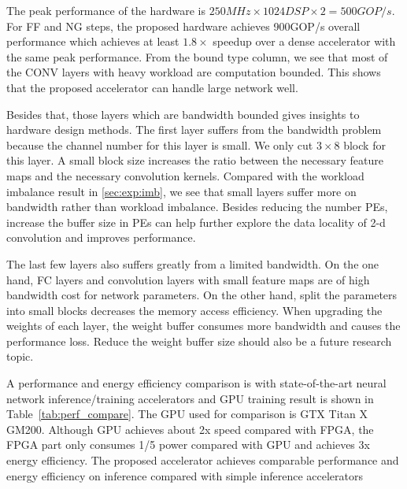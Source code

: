 



The peak performance of the hardware is $250MHz \times 1024DSP \times 2 = 500GOP/s$. For FF and NG steps, the proposed hardware achieves 900GOP/s overall performance which achieves at least $1.8\times$ speedup over a dense accelerator with the same peak performance. From the bound type column, we see that most of the CONV layers with heavy workload are computation bounded. This shows that the proposed accelerator can handle large network well.

Besides that, those layers which are bandwidth bounded gives insights to hardware design methods. The first layer suffers from the bandwidth problem because the channel number for this layer is small. We only cut $3\times 8$ block for this layer. A small block size increases the ratio between the necessary feature maps and the necessary convolution kernels. Compared with the workload imbalance result in \ref{sec:exp:imb}, we see that small layers suffer more on bandwidth rather than workload imbalance. Besides reducing the number PEs, increase the buffer size in PEs can help further explore the data locality of 2-d convolution and improves performance. 

The last few layers also suffers greatly from a limited bandwidth. On the one hand, FC layers and convolution layers with small feature maps are of high bandwidth cost for network parameters. On the other hand, split the parameters into small blocks decreases the memory access efficiency. When upgrading the weights of each layer, the weight buffer consumes more bandwidth and causes the performance loss. Reduce the weight buffer size should also be a future research topic. 

A performance and energy efficiency comparison is with state-of-the-art neural network inference/training accelerators and GPU training result is shown in Table~\ref{tab:perf_compare}. The GPU used for comparison is GTX Titan X GM200. Although GPU achieves about 2x speed compared with FPGA, the FPGA part only consumes 1/5 power compared with GPU and achieves 3x energy efficiency. The proposed accelerator achieves comparable performance and energy efficiency on inference compared with simple inference accelerators










